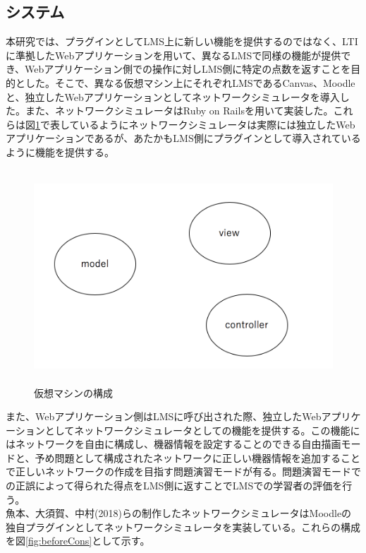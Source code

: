 \subsection{システム}
\label{tag:function}
本研究では、プラグインとしてLMS上に新しい機能を提供するのではなく、LTIに準拠したWebアプリケーションを用いて、異なるLMSで同様の機能が提供でき、Webアプリケーション側での操作に対しLMS側に特定の点数を返すことを目的とした。そこで、異なる仮想マシン上にそれぞれLMSであるCanvas、Moodleと、独立したWebアプリケーションとしてネットワークシミュレータを導入した。また、ネットワークシミュレータはRuby on Railsを用いて実装した。これらは図\ref{fig:virtualMachine}で表しているようにネットワークシミュレータは実際には独立したWebアプリケーションであるが、あたかもLMS側にプラグインとして導入されているように機能を提供する。

\begin{figure}[htbp]
  \begin{center}
    \includegraphics[clip,width=12.0cm,height=8.0cm]{img/virtualMachine.png}
    \caption{仮想マシンの構成}
    \label{fig:virtualMachine}
  \end{center}
\end{figure}



また、Webアプリケーション側はLMSに呼び出された際、独立したWebアプリケーションとしてネットワークシミュレータとしての機能を提供する。この機能にはネットワークを自由に構成し、機器情報を設定することのできる自由描画モードと、予め問題として構成されたネットワークに正しい機器情報を追加することで正しいネットワークの作成を目指す問題演習モードが有る。問題演習モードでの正誤によって得られた得点をLMS側に返すことでLMSでの学習者の評価を行う。\\
魚本、大須賀、中村(2018)らの制作したネットワークシミュレータはMoodleの独自プラグインとしてネットワークシミュレータを実装している。これらの構成を図\ref{fig:beforeCons}として示す。


